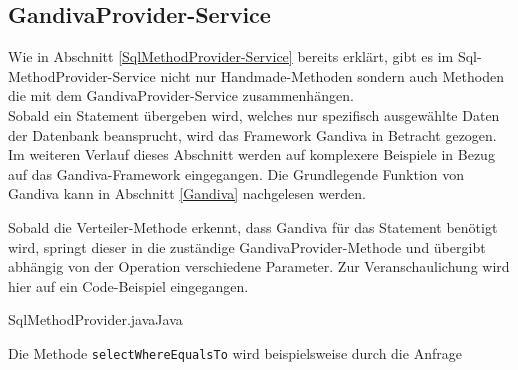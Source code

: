 \subsection{GandivaProvider-Service}
\label{GandivaProvider-Service}

Wie in Abschnitt \ref{SqlMethodProvider-Service} bereits erklärt, gibt es im Sql-MethodProvider-Service nicht nur Handmade-Methoden sondern auch Methoden die mit dem GandivaProvider-Service zusammenhängen.
\\
Sobald ein Statement übergeben wird, welches nur spezifisch ausgewählte Daten der Datenbank beansprucht, wird das Framework Gandiva in Betracht gezogen.
Im weiteren Verlauf dieses Abschnitt werden auf komplexere Beispiele in Bezug auf das Gandiva-Framework eingegangen. Die Grundlegende Funktion von Gandiva kann in Abschnitt \ref{Gandiva} nachgelesen werden.

Sobald die Verteiler-Methode erkennt, dass Gandiva für das Statement benötigt wird, springt dieser in die zuständige GandivaProvider-Methode und übergibt abhängig von der Operation verschiedene Parameter. Zur Veranschaulichung wird hier auf ein Code-Beispiel eingegangen.

\begin{codeblock}{SqlMethodProvider.java}{Java}
  \begin{javacode}
    private IndexResponse selectWhereEqualsTo(String columnName, int value, Table table) throws GandivaException {

        Filter filter = gandivaProvider.equalsTo_NumberFilter(table,columnName,value);

        ArrowRecordBatch batch = gandivaProvider.createBatch(table,columnName);

        SelectionVectorInt32 selectionVectorInt32 = gandivaProvider.createSelectionVector(table);

        filter.evaluate(batch,selectionVectorInt32);

        int[] indices = MemoryUtil.selectionVectorToArray(selectionVectorInt32);

...

  \end{javacode}
\end{codeblock}

Die Methode \texttt{selectWhereEqualsTo} wird beispielsweise durch die Anfrage

\begin{center}
\label{Where-Statement}
\end{center}

